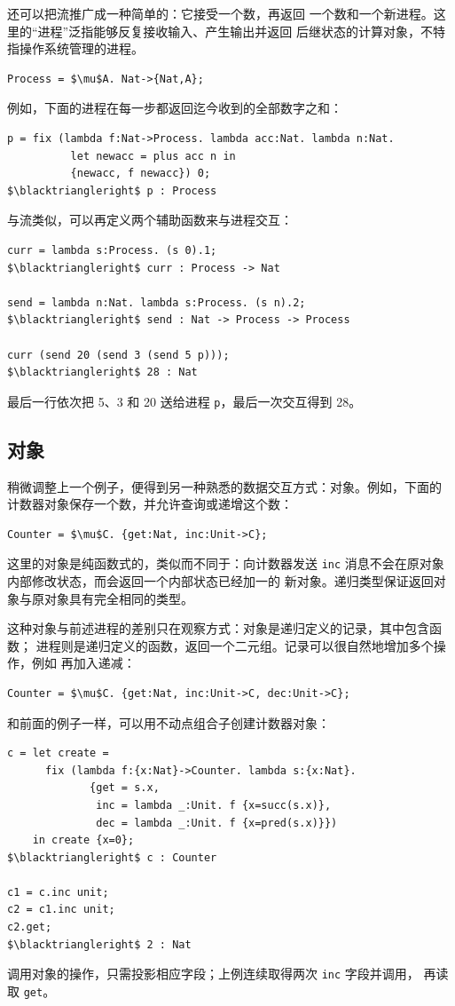 \label{exm:20.1-process}
还可以把流推广成一种简单的：它接受一个数，再返回
一个数和一个新进程。这里的“进程”泛指能够反复接收输入、产生输出并返回
后继状态的计算对象，不特指操作系统管理的进程。
\begin{lstlisting}[mathescape=true]
Process = $\mu$A. Nat->{Nat,A};
\end{lstlisting}
例如，下面的进程在每一步都返回迄今收到的全部数字之和：
\begin{lstlisting}[mathescape=true]
p = fix (lambda f:Nat->Process. lambda acc:Nat. lambda n:Nat.
          let newacc = plus acc n in
          {newacc, f newacc}) 0;
$\blacktriangleright$ p : Process
\end{lstlisting}
与流类似，可以再定义两个辅助函数来与进程交互：
\begin{lstlisting}[mathescape=true]
curr = lambda s:Process. (s 0).1;
$\blacktriangleright$ curr : Process -> Nat

send = lambda n:Nat. lambda s:Process. (s n).2;
$\blacktriangleright$ send : Nat -> Process -> Process

curr (send 20 (send 3 (send 5 p)));
$\blacktriangleright$ 28 : Nat
\end{lstlisting}
最后一行依次把 5、3 和 20 送给进程 \texttt{p}，最后一次交互得到 28。

\subsection*{对象}

稍微调整上一个例子，便得到另一种熟悉的数据交互方式：对象。例如，下面的
计数器对象保存一个数，并允许查询或递增这个数：
\begin{lstlisting}[mathescape=true]
Counter = $\mu$C. {get:Nat, inc:Unit->C};
\end{lstlisting}
这里的对象是纯函数式的，类似而不同于：向计数器发送
\texttt{inc} 消息不会在原对象内部修改状态，而会返回一个内部状态已经加一的
新对象。递归类型保证返回对象与原对象具有完全相同的类型。

这种对象与前述进程的差别只在观察方式：对象是递归定义的记录，其中包含函数；
进程则是递归定义的函数，返回一个二元组。记录可以很自然地增加多个操作，例如
再加入递减：
\begin{lstlisting}[mathescape=true]
Counter = $\mu$C. {get:Nat, inc:Unit->C, dec:Unit->C};
\end{lstlisting}
和前面的例子一样，可以用不动点组合子创建计数器对象：
\begin{lstlisting}[mathescape=true]
c = let create =
      fix (lambda f:{x:Nat}->Counter. lambda s:{x:Nat}.
             {get = s.x,
              inc = lambda _:Unit. f {x=succ(s.x)},
              dec = lambda _:Unit. f {x=pred(s.x)}})
    in create {x=0};
$\blacktriangleright$ c : Counter

c1 = c.inc unit;
c2 = c1.inc unit;
c2.get;
$\blacktriangleright$ 2 : Nat
\end{lstlisting}
调用对象的操作，只需投影相应字段；上例连续取得两次 \texttt{inc} 字段并调用，
再读取 \texttt{get}。

